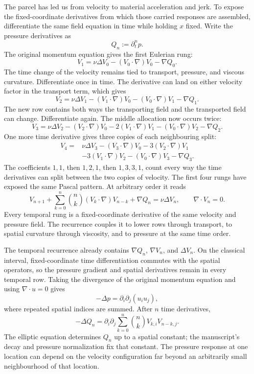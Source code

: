 
The parcel has led us from velocity to material acceleration and jerk.
To expose the fixed-coordinate derivatives from which those carried responses are assembled, differentiate the same field equation in time while holding \(x\) fixed.
Write the pressure derivatives as
\[
  Q_n:=\partial_t^n p.
\]
The original momentum equation gives the first Eulerian rung:
\[
  V_1
  =
  \nu\Delta V_0
  -(V_0\cdot\nabla)V_0
  -\nabla Q_0.
\]
The time change of the velocity remains tied to transport, pressure, and viscous curvature.
Differentiate once in time.
The derivative can land on either velocity factor in the transport term, which gives
\[
  V_2
  =
  \nu\Delta V_1
  -(V_1\cdot\nabla)V_0
  -(V_0\cdot\nabla)V_1
  -\nabla Q_1.
\]
The new row contains both ways the transporting field and the transported field can change.
Differentiate again.
The middle allocation now occurs twice:
\[
  V_3
  =
  \nu\Delta V_2
  -(V_2\cdot\nabla)V_0
  -2(V_1\cdot\nabla)V_1
  -(V_0\cdot\nabla)V_2
  -\nabla Q_2.
\]
One more time derivative gives three copies of each neighbouring split:
\[
  \begin{aligned}
  V_4
  ={}&
  \nu\Delta V_3
  -(V_3\cdot\nabla)V_0
  -3(V_2\cdot\nabla)V_1\\
  &-3(V_1\cdot\nabla)V_2
  -(V_0\cdot\nabla)V_3
  -\nabla Q_3.
  \end{aligned}
\]
The coefficients \(1,1\), then \(1,2,1\), then \(1,3,3,1\), count every way the time derivatives can split between the two copies of velocity.
The first four rungs have exposed the same Pascal pattern.
At arbitrary order it reads
\[
  V_{n+1}
  +
  \sum_{k=0}^{n}
  \binom{n}{k}
  (V_k\cdot\nabla)V_{n-k}
  +
  \nabla Q_n
  =
  \nu\Delta V_n,
  \qquad
  \nabla\cdot V_n=0.
\]
Every temporal rung is a fixed-coordinate derivative of the same velocity and pressure field.
The recurrence couples it to lower rows through transport, to spatial curvature through viscosity, and to pressure at the same time order.


The temporal recurrence already contains \(\nabla Q_n\), \(\nabla V_n\), and \(\Delta V_n\).
On the classical interval, fixed-coordinate time differentiation commutes with the spatial operators, so the pressure gradient and spatial derivatives remain in every temporal row.
Taking the divergence of the original momentum equation and using \(\nabla\cdot u=0\) gives
\[
  -\Delta p
  =
  \partial_i\partial_j(u_i u_j),
\]
where repeated spatial indices are summed.
After \(n\) time derivatives,
\[
  -\Delta Q_n
  =
  \partial_i\partial_j
  \sum_{k=0}^{n}
  \binom{n}{k}
  V_{k,i}V_{n-k,j}.
\]
The elliptic equation determines \(Q_n\) up to a spatial constant; the manuscript's decay and pressure normalization fix that constant.
The pressure response at one location can depend on the velocity configuration far beyond an arbitrarily small neighbourhood of that location.

